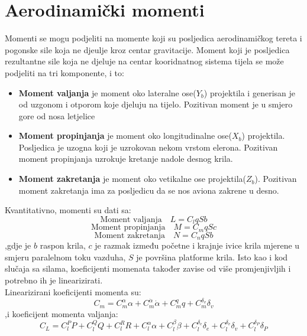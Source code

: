\section{Aerodinamički momenti}
Momenti se mogu podjeliti na momente koji su posljedica aerodinamičkog tereta i 
pogonske sile koja ne djeulje kroz centar gravitacije. Moment koji je posljedica 
rezultantne sile koja ne djeluje na centar kooridnatnog sistema tijela se može 
podjeliti na tri komponente, i to:
\begin{itemize}
    \item \textbf{Moment valjanja} je moment oko lateralne ose($Y_b$) projektila i generisan 
    je od uzgonom i otporom koje djeluju na tijelo. Pozitivan moment je u smjero gore 
    od nosa letjelice 
    
    \item \textbf{Moment propinjanja} je moment oko longitudinalne ose($X_b$) projektila.
    Posljedica je uzogna koji je uzrokovan nekom vrstom elerona. Pozitivan moment propinjanja uzrokuje kretanje nadole 
    desnog krila.
    
    \item \textbf{Moment zakretanja} je moment oko vetikalne ose projektila($Z_b$). Pozitivan moment zakretanja 
    ima za posljedicu da se nos aviona zakrene u desno. 
\end{itemize}
Kvantitativno, momenti su dati sa:
\begin{equation}
    \text{Moment valjanja} \quad L=C_lqSb
    \label{eq:a1}
 \end{equation}
 \begin{equation}
     \text{Moment propinjanja} \quad M=C_mqSc
     \label{eq:a2}
 \end{equation}
 \begin{equation}
     \text{Moment zakretanja} \quad N=C_nqSb
     \label{eq:a3}
 \end{equation}
 ,gdje je $b$ raspon krila, $c$ je razmak između početne i krajnje ivice krila mjerene 
 u smjeru paralelnom toku vazduha, $S$ je površina platforme krila. 
 Isto kao i kod slučaja sa silama, koeficijenti momenata također zavise od više promjenjivljih 
 i potrebno ih je linearizirati. \\
 Linearizirani koeficijenti momenta su:
 \begin{equation}
     C_m=C_m^{\alpha}\alpha +C_m^{\dot{\alpha}}\dot{\alpha } + C_m^q q+C_m^{\delta _v}\delta _v
 \end{equation} 
 ,i koeficijent momenta valjanja:
 \begin{equation}
     C_L = C_l^PP+C_l^QQ+C_l^RR +C_l^\alpha \alpha +C_l^\beta \beta + C_l^{\delta _e} \delta _e +C_l^{\delta _v} \delta _v
     +C_l^{\delta _P} \delta _P
 \end{equation}